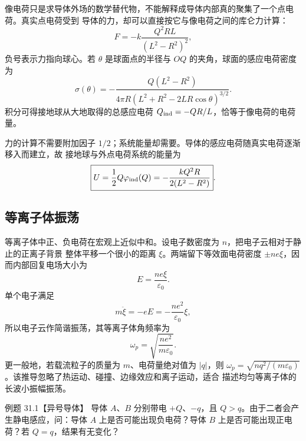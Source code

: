 \sphereImageDiagram

像电荷只是求导体外场的数学替代物，不能解释成导体内部真的聚集了一个点电荷。真实点电荷受到
导体的力，却可以直接按它与像电荷之间的库仑力计算：
\begin{equation}
  \boxed{F=-k\frac{Q^2RL}{(L^2-R^2)^2}},
\end{equation}
负号表示力指向球心。若 $\theta$ 是球面点的半径与 $OQ$ 的夹角，球面的感应电荷密度为
\begin{equation}
  \boxed{\sigma(\theta)=
  -\frac{Q(L^2-R^2)}{4\pi R
  \left(L^2+R^2-2LR\cos\theta\right)^{3/2}}}.
\end{equation}
积分可得接地球从大地取得的总感应电荷 $Q_{\rm ind}=-QR/L$，恰等于像电荷的电荷量。

力的计算不需要附加因子 $1/2$；系统能量却需要。导体的感应电荷随真实电荷逐渐移入而建立，故
接地球与外点电荷系统的能量为
\begin{equation}
  \boxed{U=\frac12Q\varphi_{\rm ind}(Q)
  =-\frac{kQ^2R}{2(L^2-R^2)}}.
\end{equation}

\subsection*{等离子体振荡}

等离子体中正、负电荷在宏观上近似中和。设电子数密度为 $n$，把电子云相对于静止的正离子背景
整体平移一个很小的距离 $\xi$。两端留下等效面电荷密度 $\pm ne\xi$，因而内部回复电场大小为
\begin{equation}
  E=\frac{ne\xi}{\varepsilon_0}.
\end{equation}
单个电子满足
\begin{equation}
  m\ddot\xi=-eE=-\frac{ne^2}{\varepsilon_0}\xi,
\end{equation}
所以电子云作简谐振荡，其等离子体角频率为
\begin{equation}
  \boxed{\omega_p=\sqrt{\frac{ne^2}{m\varepsilon_0}}}.
\end{equation}
更一般地，若载流粒子的质量为 $m$、电荷量绝对值为 $|q|$，则
$\omega_p=\sqrt{nq^2/(m\varepsilon_0)}$。该推导忽略了热运动、碰撞、边缘效应和离子运动，适合
描述均匀等离子体的长波小振幅振荡。

\plasmaOscillationDiagram

\ionosphereDiagram





\Needspace{0.34\textheight}
\begin{origexamplebox}{例题 31.1【异号导体】}
导体 $A$、$B$ 分别带电 $+Q$、$-q$，且 $Q>q$。由于二者会产生静电感应，问：导体 $A$
上是否可能出现负电荷？导体 $B$ 上是否可能出现正电荷？若 $Q=q$，结果有无变化？
\end{origexamplebox}

